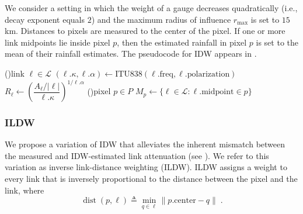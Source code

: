 \documentclass[a4paper,fleqn]{cas-sc}
\begin{document}
We consider a setting in which the weight of a gauge decreases quadratically (i.e., decay exponent equals $2$) and the maximum radius of influence $r_{\max}$ is set to $15$ \si{\kilo\meter}. Distances to pixels are measured to the center of the pixel.
If one or more link midpoints lie inside pixel $p$, then the estimated rainfall in pixel $p$ is set to the mean of their rainfall estimates. The pseudocode for IDW appears in .


\begin{algorithm}[H]
  \caption{Discretized IDW. Each link is replaced with a virtual gauge located at the midpoint of the link. The rain-rate at the gauge is set to the rain-rate equivalent of its link. IDW is then applied with respect to these virtual gauges. We set the exponent of the decay to $2$. }
  \label{alg:idw}
  \DontPrintSemicolon
  \ForEach(){link $\ell \in \mathcal{L}$}{%
    $(\ell.\kappa,\ell.\alpha) \gets \mathrm{ITU838}(\ell.\mathrm{freq},\ell.\mathrm{polarization})$\;
    $R_\ell\gets \left(\dfrac{A_\ell/|\ell|}{\ell.\kappa}\right)^{1/\ell.\alpha}$\;
  }
  \ForEach(){pixel $p \in {P}$}{
    $M_p \gets \{\ell \in \mathcal{L} : \ell.\mathrm{midpoint} \in p\}$\;
  }
\end{algorithm}


\subsubsection{ILDW}
We propose a variation of IDW that alleviates the inherent mismatch between the measured and IDW-estimated link attenuation (see ).
We refer to this variation as inverse link-distance weighting (ILDW).
ILDW assigns a weight to every link that is inversely proportional to the distance between the pixel and the link, where
\[
  \operatorname{dist}(p,\ell) \triangleq \min_{q\in \ell} \|p.\textrm{center}-q\|\;.
\]
\end{document}
